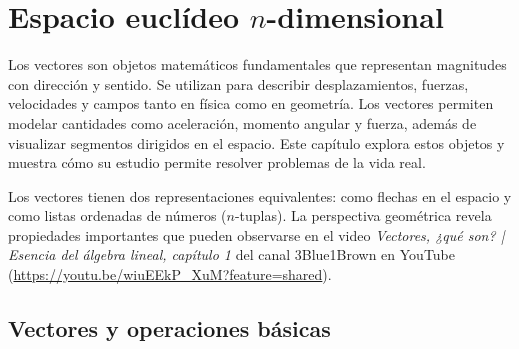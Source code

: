\chapter{Espacio euclídeo $n$-dimensional} \label{vegern}

Los vectores son objetos matemáticos fundamentales que representan magnitudes con dirección y sentido. Se utilizan para describir desplazamientos, fuerzas, velocidades y campos tanto en física como en geometría. Los vectores permiten modelar cantidades como aceleración, momento angular y fuerza, además de visualizar segmentos dirigidos en el espacio. Este capítulo explora estos objetos y muestra cómo su estudio permite resolver problemas de la vida real.

Los vectores tienen dos representaciones equivalentes: como flechas en el espacio y como listas ordenadas de números ($n$-tuplas). La perspectiva geométrica revela propiedades importantes que pueden observarse en el video \textit{Vectores, ¿qué son? | Esencia del álgebra lineal, capítulo 1} del canal 3Blue1Brown en YouTube (\url{https://youtu.be/wiuEEkP_XuM?feature=shared}).

\section{Vectores y operaciones básicas}

